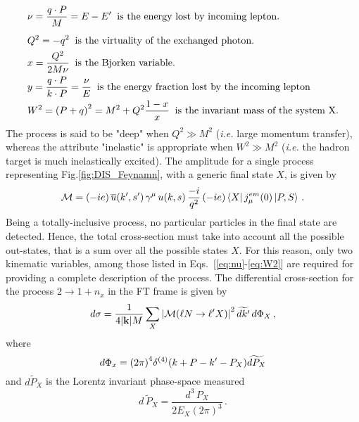 \begin{align}
        & \nu = \frac{q \cdot P}{M} = E - E' \;\; \textrm{is the energy lost by incoming lepton.}
        \label{eq:nu}\\[5pt]
        & Q^2 = - q^2 \;\; \textrm{is the virtuality of the exchanged photon.}
        \label{eq:Q2}\\
        & x=\frac{Q^2}{2M\nu} \;\; \textrm{is the Bjorken variable.}
        \label{eq:x}\\
        & y = \frac{q\cdot P}{k \cdot P} = \frac{\nu}{E} \; \; \textrm{is the energy fraction lost by the incoming lepton}
        \label{eq:y}\\
        & W^2 = \qty(P + q)^2 = M^2 + Q^2 \frac{1-x}{x} \;\; \textrm{is the invariant mass of the system X.}
        \label{eq:W2}
\end{align}
The process  is said to be "deep" when $Q^2 \gg M^2$ (\textit{i.e.} large momentum transfer), whereas the attribute "inelastic" is appropriate when $W^2 \gg M^2$ (\textit{i.e.} the hadron target is much inelastically excited). The amplitude for a single process representing Fig.\ref{fig:DIS_Feynamn}, with a generic final state $X$, is given by
\begin{equation}
    \mathcal{M} = (-i e) \, \overline{u}(k',s') \, \gamma^{\mu}\, u(k,s) \, \frac{-i}{q^2} \, (-i e)\bra{X} j_{\mu}^{em} \qty(0) \ket{P,S} \,.
    \label{eq:ch2:amplitude}
\end{equation}
Being a totally-inclusive process, no particular particles in the final state are detected. Hence, the total cross-section must take into account all the possible out-states, that is a sum over all the possible states $X$. For this reason, only two kinematic variables, among those listed in Eqs.~[\ref{eq:nu}-\ref{eq:W2}] are required for providing a complete description of the process. The differential cross-section for the process $2 \rightarrow 1 + n_x$ in the FT frame is given by 
\begin{equation}
    d\sigma = \frac{1}{4 \qty|\vb{k}| M} \sum_{X} \qty| \mathcal{M} \qty( \ell N \rightarrow \ell'X ) |^2 \, \widetilde{d k'} \,  d\Phi_X \, ,
    \label{eq:ch2:dsigma}
\end{equation}
where
\begin{equation}
        d \Phi_x = \qty(2\pi)^4 \delta^{(4)} \qty( k + P - k' - P_X ) \widetilde{dP_X}  
\end{equation}
and $\widetilde{dP_X}$ is the Lorentz invariant phase-space measured
\begin{equation}
    \widetilde{d\, P_X} = \frac{d^3 \, P_X}{2 E_X (2\pi)^3} \,.
\end{equation}
